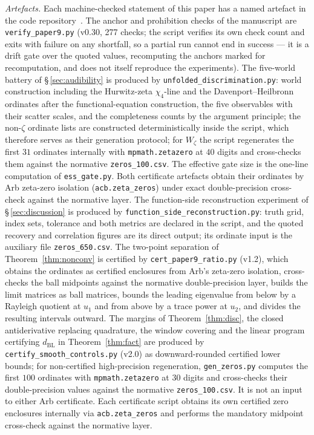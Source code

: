 \documentclass[11pt]{article}
\newcommand{\dBL}{d_{\mathrm{BL}}}              %
\begin{document}
\emph{Artefacts.} Each machine-checked statement of this paper has a named
artefact in the code repository~\cite{Code}. The anchor and prohibition checks
of the manuscript are \texttt{verify\_paper9.py} (v0.30, 277 checks;
the script verifies its own check count and exits with failure on any
shortfall, so a partial run cannot end in success --- it is a drift gate over
the quoted values, recomputing the anchors marked for recomputation, and does
not itself reproduce the experiments). The five-world battery of
\S\,\ref{sec:audibility} is produced by \texttt{unfolded\_discrimination.py}:
world construction including the Hurwitz-zeta $\chi_4$-line and the
Davenport--Heilbronn ordinates after the functional-equation construction,
the five observables with their scatter scales, and the completeness counts
by the argument principle; the non-$\zeta$ ordinate lists are constructed
deterministically inside the script, which therefore serves as their
generation protocol; for $W_\zeta$ the script regenerates the first $31$
ordinates internally with \texttt{mpmath.zetazero} at $40$ digits and
cross-checks them against the normative \texttt{zeros\_100.csv}. The effective gate
size is the one-line computation of \texttt{ess\_gate.py}. Both
certificate artefacts obtain their ordinates by Arb zeta-zero isolation
(\texttt{acb.zeta\_zeros}) under exact double-precision cross-check
against the normative layer. The function-side reconstruction experiment of \S\,\ref{sec:discussion} is
produced by \texttt{function\_side\_reconstruction.py}: truth grid, index sets, tolerance and
both metrics are declared in the script, and the quoted recovery and
correlation figures are its direct output; its ordinate input is the
auxiliary file \texttt{zeros\_650.csv}. The two-point separation of
Theorem~\ref{thm:nonconv} is certified by \texttt{cert\_paper9\_ratio.py}
(v1.2), which obtains the ordinates as certified enclosures from Arb's
zeta-zero isolation, cross-checks the ball midpoints against the normative
double-precision layer, builds the limit matrices as ball matrices, bounds the
leading eigenvalue from below by a Rayleigh quotient at $u_1$ and from above
by a trace power at $u_2$, and divides the resulting intervals outward. The margins of Theorem~\ref{thm:disc}, the closed
antiderivative replacing quadrature, the window covering and the linear
program certifying $\dBL$ in Theorem~\ref{thm:fact} are produced by
\texttt{certify\_smooth\_controls.py} (v2.0) as downward-rounded certified lower bounds;
for non-certified high-precision regeneration,
\texttt{gen\_zeros.py} computes the first $100$ ordinates with
\texttt{mpmath.zetazero} at $30$ digits and cross-checks their
double-precision values against the normative \texttt{zeros\_100.csv}. It
is not an input to either Arb certificate. Each certificate script obtains
its own certified zero enclosures internally via \texttt{acb.zeta\_zeros}
and performs the mandatory midpoint cross-check against the normative
layer.
\end{document}
